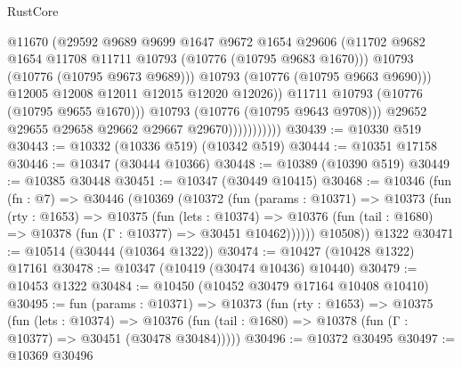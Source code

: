 \begin{lexlean}{RustCore}
\begin{coremodule}
                                    @11670
                                    (@29592
                                      @9689
                                      @9699
                                      @1647
                                      @9672
                                      @1654
                                      @29606
                                      (@11702
                                        @9682
                                        @1654
                                        @11708
                                        @11711
                                        @10793
                                        (@10776 (@10795 @9683 @1670)))
                                      @10793
                                      (@10776 (@10795 @9673 @9689)))
                                    @10793
                                    (@10776 (@10795 @9663 @9690)))
                                  @12005
                                  @12008
                                  @12011
                                  @12015
                                  @12020
                                  @12026))
                              @11711
                              @10793
                              (@10776 (@10795 @9655 @1670)))
                            @10793
                            (@10776 (@10795 @9643 @9708)))
                          @29652
                          @29655
                          @29658
                          @29662
                          @29667
                          @29670)))))))))))
@30439 := @10330 @519
@30443 := @10332 (@10336 @519) (@10342 @519)
@30444 := @10351 @17158
@30446 := @10347 (@30444 @10366)
@30448 := @10389 (@10390 @519)
@30449 := @10385 @30448
@30451 := @10347 (@30449 @10415)
@30468 := @10346
    (fun (fn : @7) =>
    @30446
      (@10369
        (@10372
          (fun (params : @10371) =>
          @10373
            (fun (rty : @1653) =>
            @10375
              (fun (lets : @10374) =>
              @10376 (fun (tail : @1680) => @10378 (fun (Γ : @10377) => @30451 @10462))))))
        @10508))
    @1322
@30471 := @10514 (@30444 (@10364 @1322))
@30474 := @10427 (@10428 @1322) @17161
@30478 := @10347 (@10419 (@30474 @10436) @10440)
@30479 := @10453 @1322
@30484 := @10450 (@10452 @30479 @17164 @10408 @10410)
@30495 := fun (params : @10371) =>
  @10373
    (fun (rty : @1653) =>
    @10375
      (fun (lets : @10374) =>
      @10376 (fun (tail : @1680) => @10378 (fun (Γ : @10377) => @30451 (@30478 @30484)))))
@30496 := @10372 @30495
@30497 := @10369 @30496

\end{coremodule}
\end{lexlean}
